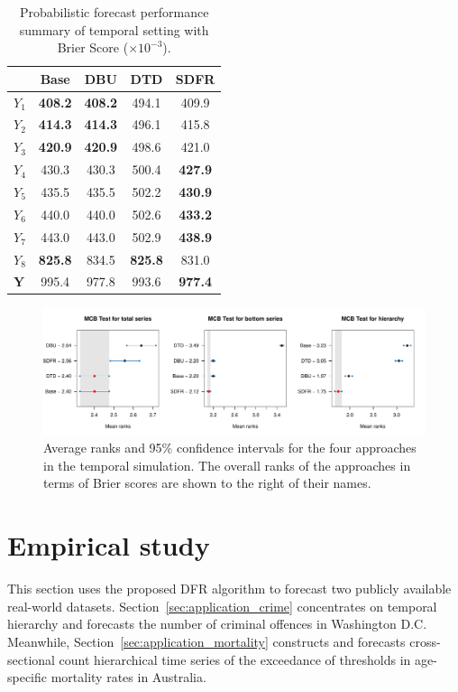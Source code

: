 \documentclass[a4paper,review,12pt,authoryear]{elsarticle}
\newcommand{\bY}{\mathbf{Y}}
\theoremstyle{definition}
\begin{document}
     \begin{table}
     \centering
     \caption{\label{tab:sim_temporal_res_dist} Probabilistic forecast performance summary of temporal setting with Brier Score ($\times 10^{-3}$).}
     \begin{tabular}{lcccc}
     \toprule
      & Base & DBU & DTD & SDFR \\\midrule
     $Y_1$ & \textbf{408.2} & \textbf{408.2} & 494.1 & 409.9 \\
     $Y_2$ & \textbf{414.3} & \textbf{414.3} & 496.1 & 415.8\\
     $Y_3$ & \textbf{420.9} & \textbf{420.9} & 498.6 & 421.0\\
     $Y_4$ & 430.3 & 430.3  & 500.4          & \textbf{427.9}\\
     $Y_5$ & 435.5 & 435.5  & 502.2          & \textbf{430.9} \\
     $Y_6$ & 440.0 & 440.0  & 502.6          & \textbf{433.2} \\
     $Y_7$ & 443.0 & 443.0  & 502.9          & \textbf{438.9} \\
     $Y_8$ & \textbf{825.8} & 834.5          & \textbf{825.8} & 831.0\\
     $\bY$ & 995.4 & 977.8  & 993.6          & \textbf{977.4} \\
     \bottomrule
     \end{tabular}
     \end{table}


     \begin{figure}
       \caption{\label{fig:sim_temporal_mcb_prob}Average ranks and 95\% confidence intervals for the four approaches in the temporal simulation. The overall ranks of the approaches in terms of Brier scores are shown to the right of their names.}
       \includegraphics[width=\textwidth]{figures/temporal_mcb.pdf}
     \end{figure}

     \section{Empirical study}
     \label{sec:application}
     This section uses the proposed DFR algorithm to forecast two publicly available real-world datasets.
     Section~\ref{sec:application_crime} concentrates on temporal hierarchy and forecasts the number of criminal offences in Washington D.C.
     Meanwhile, Section~\ref{sec:application_mortality} constructs and forecasts cross-sectional count hierarchical time series of the exceedance of thresholds in age-specific mortality rates in Australia.
\end{document}
